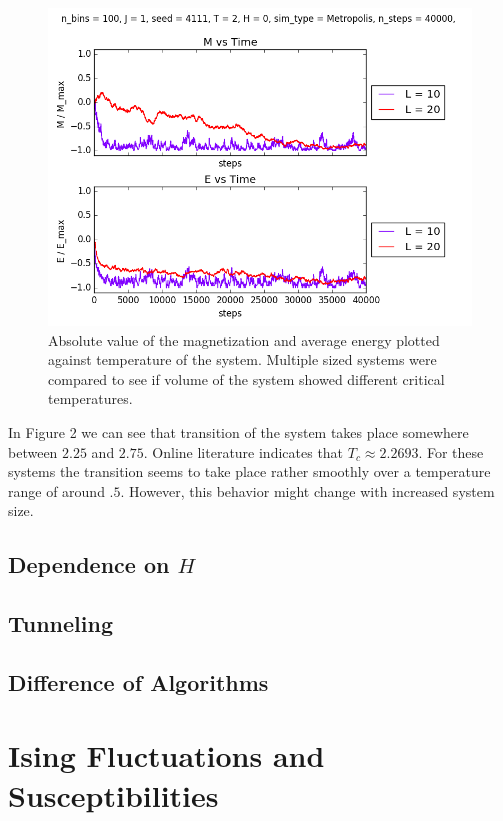 \documentclass[a4paper,11pt]{article}
\begin{document}
        \begin{figure}[H]
            \centering
            \includegraphics[width=.75\textwidth]{Graphs/Find_Tc_slice_2.png}
            \caption{ Absolute value of the magnetization and average energy plotted against temperature of the system. Multiple sized systems were compared to see if volume of the system showed different critical temperatures.}
        \end{figure}

        In Figure 2 we can see that transition of the system takes place somewhere between $2.25$ and $2.75$. Online literature indicates that $T_c \approx 2.2693$. For these systems the transition seems to take place rather smoothly over a temperature range of around $.5$. However, this behavior might change with increased system size.

    \subsection{Dependence on $H$}

    \subsection{Tunneling}

    \subsection{Difference of Algorithms}


\section{Ising Fluctuations and Susceptibilities}
\end{document}

